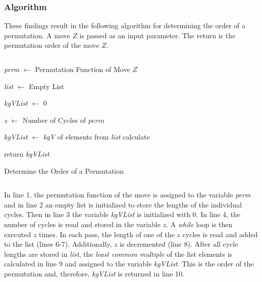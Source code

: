 \subsubsection*{Algorithm}

These findings result in the following algorithm for determining the order of a permutation. A move $Z$ is passed as an input parameter. The return is the permutation order of the move $Z$.\newpage

\begin{minipage}[H]{0.14\textwidth}
      $\ $
\end{minipage}
\begin{minipage}[H]{0.72\textwidth}
\begin{algorithm}[H]
\LinesNumbered
\DontPrintSemicolon
{}
\BlankLine
 \textit{perm} $\leftarrow$ Permutation Function of Move $Z$\;

  \textit{list} $\leftarrow$ Empty List \;
  
  \textit{kgVList} $\leftarrow$ 0 \;

  \textit{z} $\leftarrow$ Number of Cycles of $perm$ \; 

  \textit{kgVList} $\leftarrow$ \textit{kgV} of elements from  \textit{list} calculate \;

 return \textit{kgVList} \;

\caption{Determine the Order of a Permutation} 
\label{Algorithm_OrderPermutation}
\end{algorithm}
\end{minipage}
\begin{minipage}[H]{0.14\textwidth}
      $\ $
\end{minipage}

In line 1, the permutation function of the move is assigned to the variable \textit{perm} and in line 2 an empty list is initialized to store the lengths of the individual cycles. Then in line 3 the variable \textit{kgVList} is initialized with 0. In line 4, the number of cycles is read and stored in the variable $z$. A \textit{while} loop is then executed $z$ times. In each pass, the length of one of the $z$ cycles is read and added to the list (lines 6-7). Additionally, $z$ is decremented (line 8). After all cycle lengths are stored in \textit{list}, the \textit{least common multiple} of the list elements is calculated in line 9 and assigned to the variable \textit{kgVList}. This is the order of the permutation and, therefore, \textit{kgVList} is returned in line 10.

